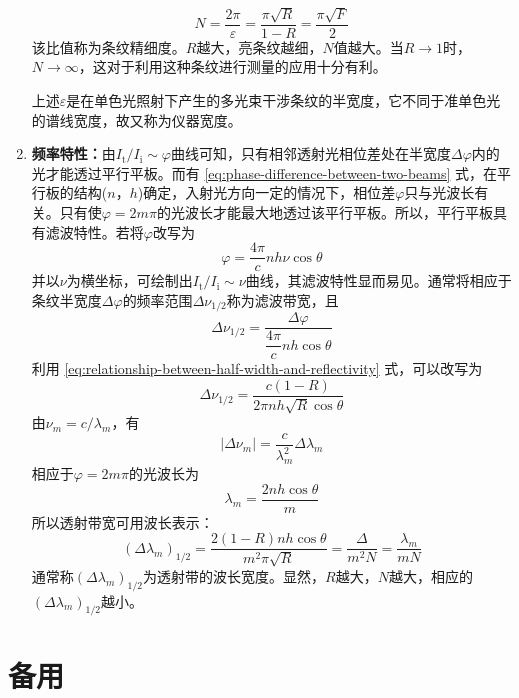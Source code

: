 \documentclass[cn,10pt,chinesefont=founder,math=mtpro2,cite=super,toc=onecol,twoside,openany]{elegantbook}
\begin{document}
\begin{enumerate}
\begin{equation}
	N=\frac{2\pi}{\varepsilon}=\frac{\pi\sqrt{R}}{1-R}=\frac{\pi\sqrt{F}}{2}
	\end{equation}
	该比值称为条纹精细度。$R$越大，亮条纹越细，$N$值越大。当$R\rightarrow1$时，$N\rightarrow\infty$，这对于利用这种条纹进行测量的应用十分有利。
	\begin{note}
		上述$\varepsilon$是在单色光照射下产生的多光束干涉条纹的半宽度，它不同于准单色光的谱线宽度，故又称为仪器宽度。
	\end{note}
	\item \textbf{频率特性：}由$I_{\mathrm{t}}/I_{\mathrm{i}}\sim\varphi$曲线可知，只有相邻透射光相位差处在半宽度$\Delta\varphi$内的光才能透过平行平板。而有 \eqref{eq:phase-difference-between-two-beams} 式，在平行板的结构($n$，$h$)确定，入射光方向一定的情况下，相位差$\varphi$只与光波长有关。只有使$\varphi=2m\pi$的光波长才能最大地透过该平行平板。所以，平行平板具有滤波特性。若将$\varphi$改写为
	\begin{equation}
	\varphi=\frac{4\pi}{c}nh\nu\cos\theta
	\end{equation}
	并以$\nu$为横坐标，可绘制出$I_{\mathrm{t}}/I_{\mathrm{i}}\sim\nu$曲线，其滤波特性显而易见。通常将相应于条纹半宽度$\Delta\varphi$的频率范围$\Delta\nu_{1/2}$称为滤波带宽，且
	\begin{equation}
	\Delta\nu_{1/2}=\frac{\Delta\varphi}{\dfrac{4\pi}{c}nh\cos\theta}
	\end{equation}
	利用 \eqref{eq:relationship-between-half-width-and-reflectivity} 式，可以改写为
	\begin{equation}
	\Delta\nu_{1/2}=\frac{c(1-R)}{2\pi nh\sqrt{R}\cos\theta}
	\end{equation}
	由$\nu_m=c/\lambda_m$，有
	\begin{equation}
	|\Delta\nu_m|=\frac{c}{\lambda^2_m}\Delta\lambda_m
	\end{equation}
	相应于$\varphi=2m\pi$的光波长为
	\begin{equation}
	\lambda_m=\frac{2nh\cos\theta}{m}
	\end{equation}
	所以透射带宽可用波长表示：
	\begin{equation}
	(\Delta\lambda_m)_{1/2}=\frac{2(1-R)nh\cos\theta}{m^2\pi\sqrt{R}}=\frac{\varDelta}{m^2N}=\frac{\lambda_m}{mN}
	\end{equation}
	通常称$(\Delta\lambda_m)_{1/2}$为透射带的波长宽度。显然，$R$越大，$N$越大，相应的$(\Delta\lambda_m)_{1/2}$越小。
\end{enumerate}



















%
\appendix
\chapter{备用}
\end{document}
